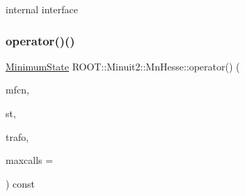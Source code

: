 internal interface \mbox{\label{classROOT_1_1Minuit2_1_1MnHesse_a4130de0190695811a4606f8ab229482d}} 
\subsubsection{\texorpdfstring{operator()()}{operator()()}\hspace{0.1cm}{\footnotesize\ttfamily [16/16]}}
{\footnotesize\ttfamily \mbox{\hyperlink{classROOT_1_1Minuit2_1_1MinimumState}{Minimum\+State}} R\+O\+O\+T\+::\+Minuit2\+::\+Mn\+Hesse\+::operator() (\begin{DoxyParamCaption}\item[{const \mbox{\hyperlink{classROOT_1_1Minuit2_1_1MnFcn}{Mn\+Fcn}} \&}]{mfcn,  }\item[{const \mbox{\hyperlink{classROOT_1_1Minuit2_1_1MinimumState}{Minimum\+State}} \&}]{st,  }\item[{const \mbox{\hyperlink{classROOT_1_1Minuit2_1_1MnUserTransformation}{Mn\+User\+Transformation}} \&}]{trafo,  }\item[{unsigned int}]{maxcalls = {} }\end{DoxyParamCaption}) const}

